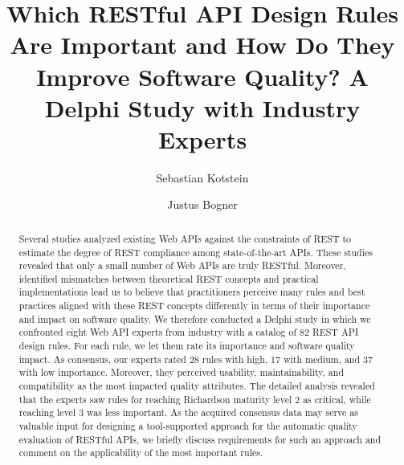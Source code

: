 \documentclass[runningheads]{llncs}
\begin{document}
\title{Which RESTful API Design Rules Are Important and How Do They Improve Software Quality? A Delphi Study with Industry Experts}


%
%
\author{
    Sebastian Kotstein \and
	Justus Bogner
}
%
%
%
\maketitle              %
%
\begin{abstract}
Several studies analyzed existing Web APIs against the constraints of REST to estimate the degree of REST compliance among state-of-the-art APIs. These studies revealed that only a small number of Web APIs are truly RESTful. Moreover, identified mismatches between theoretical REST concepts and practical implementations lead us to believe that practitioners perceive many rules and best practices aligned with these REST concepts differently in terms of their importance and impact on software quality. We therefore conducted a Delphi study in which we confronted eight Web API experts from industry with a catalog of 82 REST API design rules. For each rule, we let them rate its importance and software quality impact. As consensus, our experts rated 28 rules with high, 17 with medium, and 37 with low importance. Moreover, they perceived usability, maintainability, and compatibility as the most impacted quality attributes. The detailed analysis revealed that the experts saw rules for reaching Richardson maturity level 2 as critical, while reaching level 3 was less important. As the acquired consensus data may serve as valuable input for designing a tool-supported approach for the automatic quality evaluation of RESTful APIs, we briefly discuss requirements for such an approach and comment on the applicability of the most important rules.
\end{abstract}
\end{document}
